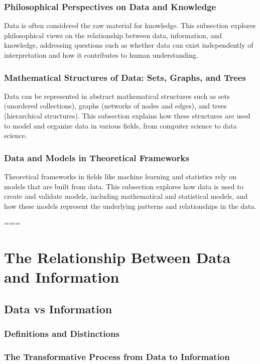 \documentclass[12pt, oneside]{book}
\begin{document}
\subsubsection{Philosophical Perspectives on Data and Knowledge}
Data is often considered the raw material for knowledge. This subsection explores philosophical views on the relationship between data, information, and knowledge, addressing questions such as whether data can exist independently of interpretation and how it contributes to human understanding.

\subsubsection{Mathematical Structures of Data: Sets, Graphs, and Trees}
Data can be represented in abstract mathematical structures such as sets (unordered collections), graphs (networks of nodes and edges), and trees (hierarchical structures). This subsection explains how these structures are used to model and organize data in various fields, from computer science to data science.

\subsubsection{Data and Models in Theoretical Frameworks}
Theoretical frameworks in fields like machine learning and statistics rely on models that are built from data. This subsection explores how data is used to create and validate models, including mathematical and statistical models, and how these models represent the underlying patterns and relationships in the data.

===

\section{The Relationship Between Data and Information}
\subsection{Data vs Information}
\subsubsection{Definitions and Distinctions}
\subsubsection{The Transformative Process from Data to Information}
\end{document}
